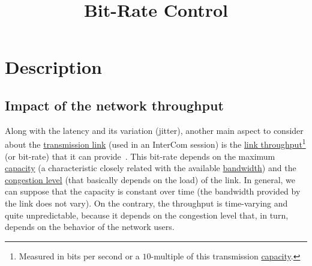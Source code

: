 
\title{Bit-Rate Control}


\maketitle

\tableofcontents

\section{Description}
\subsection{Impact of the network throughput}
Along with the latency and its variation (jitter), another main aspect
to consider about the
\href{https://en.wikipedia.org/wiki/Telecommunications_link}{transmission
  link} (used in an InterCom session) is the
\href{https://en.wikipedia.org/wiki/Channel_capacityhttps://en.wikipedia.org/wiki/Network_throughput}{link
  throughput}\footnote{Measured in bits per second or a $10$-multiple
  of this transmission
  \href{https://en.wikipedia.org/wiki/Bandwidth_(computing)}{capacity}.} (or bit-rate)
that it can provide~\cite{Forouzan,Tanenbaum}. This bit-rate depends on
the maximum
\href{https://en.wikipedia.org/wiki/Channel_capacity}{capacity} (a
characteristic closely related with the available
\href{https://en.wikipedia.org/wiki/Bandwidth_(signal_processing)}{bandwidth})
and the
\href{https://en.wikipedia.org/wiki/Network_congestion}{congestion
  level} (that basically depends on the load) of the link. In general,
we can suppose that the capacity is constant over time (the
bandwidth provided by the link does not vary). On the
contrary, the throughput is time-varying and quite unpredictable,
because it depends on the congestion level that, in turn, depends
on the behavior of the network users.

